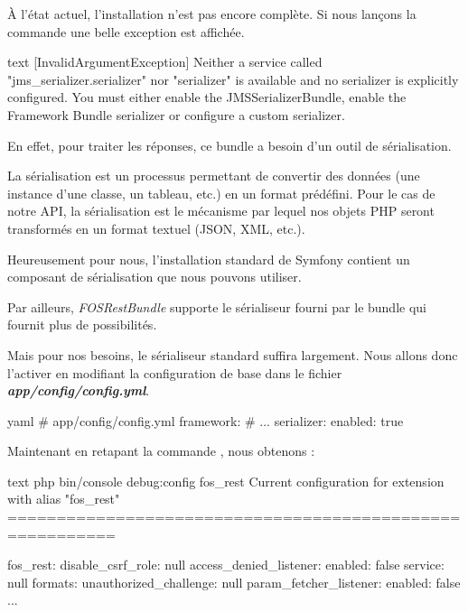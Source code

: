 \documentclass[big]{zmdocument}
\begin{document}
À l'état actuel, l'installation n'est pas encore complète. Si nous lançons la commande  une belle exception est affichée.



\begin{CodeBlock}{text}
 [InvalidArgumentException]
  Neither a service called "jms_serializer.serializer" nor "serializer" is available and no serializer is explicitly configured. You must either enable the JMSSerializerBundle, enable the Framework
  Bundle serializer or configure a custom serializer.
\end{CodeBlock}



En effet, pour traiter les réponses, ce bundle a besoin d'un outil de sérialisation.



\begin{Information}
La sérialisation est un processus permettant de convertir des données (une instance d'une classe, un tableau, etc.) en un format prédéfini. Pour le cas de notre API, la sérialisation est le mécanisme par lequel nos objets PHP seront transformés en un format textuel (JSON, XML, etc.).
\end{Information}


Heureusement pour nous, l'installation standard de Symfony contient un composant de sérialisation que nous pouvons utiliser.



Par ailleurs, \textit{FOSRestBundle} supporte le sérialiseur fourni par le bundle  qui fournit plus de possibilités.



Mais pour nos besoins, le sérialiseur standard suffira largement. Nous allons donc l'activer en modifiant la configuration de base dans le fichier \textbf{\textit{app/config/config.yml}}.



\begin{CodeBlock}{yaml}
# app/config/config.yml
framework:
    # ...
    serializer:
        enabled: true
\end{CodeBlock}



Maintenant en retapant la commande , nous obtenons :



\begin{CodeBlock}{text}
php bin/console debug:config fos_rest
Current configuration for extension with alias "fos_rest"
=========================================================

fos_rest:
    disable_csrf_role: null
    access_denied_listener:
        enabled: false
        service: null
        formats: {  }
    unauthorized_challenge: null
    param_fetcher_listener:
        enabled: false
    ...
\end{CodeBlock}
\end{document}
